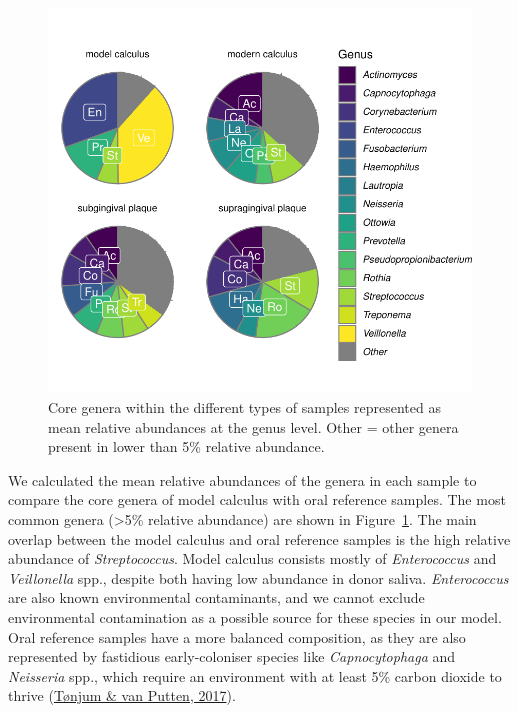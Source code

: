 \documentclass[
  b5paper,
]{book}
\begin{document}
\begin{figure}

{\centering \includegraphics{figures/byoc-valid-fig-core-genera-1.pdf}

}

\caption{\label{fig-core-genera}Core genera within the different types
of samples represented as mean relative abundances at the genus level.
Other = other genera present in lower than 5\% relative abundance.}

\end{figure}

We calculated the mean relative abundances of the genera in each sample
to compare the core genera of model calculus with oral reference
samples. The most common genera (\textgreater5\% relative abundance) are
shown in Figure~\ref{fig-core-genera}. The main overlap between the
model calculus and oral reference samples is the high relative abundance
of \emph{Streptococcus}. Model calculus consists mostly of
\emph{Enterococcus} and \emph{Veillonella} spp., despite both having low
abundance in donor saliva. \emph{Enterococcus} are also known
environmental contaminants, and we cannot exclude environmental
contamination as a possible source for these species in our model. Oral
reference samples have a more balanced composition, as they are also
represented by fastidious early-coloniser species like
\emph{Capnocytophaga} and \emph{Neisseria} spp., which require an
environment with at least 5\% carbon dioxide to thrive
(\protect\hyperlink{ref-tonjumNeisseria2017}{Tønjum \& van Putten,
2017}).
\end{document}
